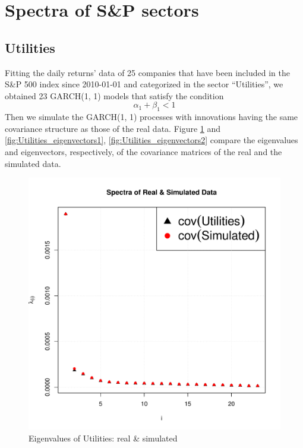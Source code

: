 \documentclass{article}
\begin{document}
\section{Spectra of S\&P sectors}
\subsection{Utilities}
Fitting the daily returns' data of 25 companies that have been
included in the S\&P 500 index since 2010-01-01 and categorized in the
sector ``Utilities'', we obtained 23 GARCH(1, 1) models that satisfy
the condition
\begin{equation}
  \label{eq:garch_cond1}
  \alpha_1 + \beta_1 < 1  
\end{equation}
Then we simulate the GARCH(1, 1) processes with innovations having the
same covariance structure as those of the real data. Figure
\ref{fig:Utilities_eigenvalues} and \ref{fig:Utilities_eigenvectors1},
\ref{fig:Utilities_eigenvectors2}
compare the eigenvalues and eigenvectors, respectively, of the 
covariance matrices of the real and the simulated data.
\begin{figure}[htb!]
  \centering
  \includegraphics[scale=0.4]{Utilities_eigenvalues.pdf}
  \caption{Eigenvalues of Utilities: real \& simulated}
  \label{fig:Utilities_eigenvalues}
\end{figure}
\end{document}
